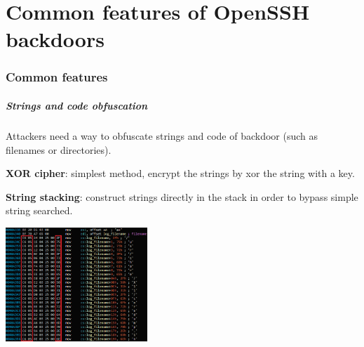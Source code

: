\part{Common features of OpenSSH backdoors}
\section{Common features}

\begin{frame}
	\partpage
\end{frame}

\begin{frame}
	\frametitle{Strings and code obfuscation}
	
	Attackers need a way to obfuscate strings and code of backdoor (such as filenames or directories).
	
	\medskip
	
	\textbf{XOR cipher}: simplest method, encrypt the strings by xor the string with a key.
	
	\medskip
	
	\textbf{String stacking}: construct strings directly in the stack in order to bypass simple string searched.
	
	\centering
  \includegraphics[width=0.4\textwidth]{images/string_stacking}

\end{frame}


